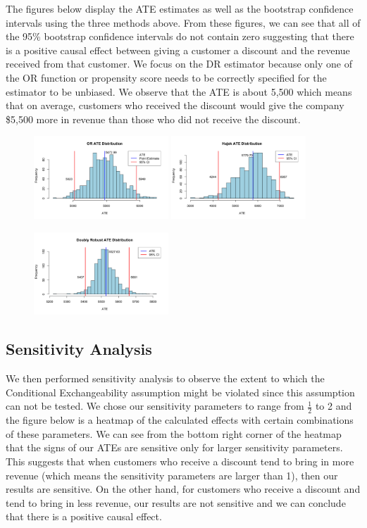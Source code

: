 \documentclass{article}
\begin{document}
The figures below display the ATE estimates as well as the bootstrap confidence intervals using the three methods above. From these figures, we can see that all of the 95\% bootstrap confidence intervals do not contain zero suggesting that there is a positive causal effect between giving a customer a discount and the revenue received from that customer. We focus on the DR estimator because only one of the OR function or propensity score needs to be correctly specified for the estimator to be unbiased. We observe that the ATE is about 5,500 which means that on average, customers who received the discount would give the company \$5,500 more in revenue than those who did not receive the discount.
\begin{figure}[H]
  \includegraphics[width = 0.45\textwidth]{figs/or.png}
  \includegraphics[width = 0.45\textwidth]{figs/hajek.png}
\end{figure}
\begin{figure}[H]
  \centering
  \includegraphics[width = 0.45\textwidth]{figs/dr.png}
\end{figure}
\subsection{Sensitivity Analysis}
We then performed sensitivity analysis to observe the extent to which the Conditional Exchangeability assumption might be violated since this assumption can not be tested. We chose our sensitivity parameters to range from $\frac{1}{2}$ to 2 and the figure below is a heatmap of the calculated effects with certain combinations of these parameters. We can see from the bottom right corner of the heatmap that the signs of our ATEs are sensitive only for larger sensitivity parameters. This suggests that when customers who receive a discount tend to bring in more revenue (which means the sensitivity parameters are larger than 1), then our results are sensitive. On the other hand, for customers who receive a discount and tend to bring in less revenue, our results are not sensitive and we can conclude that there is a positive causal effect.
\end{document}
